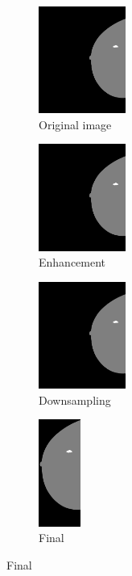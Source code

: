 \documentclass{beamer}
\begin{document}
\begin{frame}
\begin{figure}[h]
\begin{subfigure}{0.24\textwidth}
				\centering
					\includegraphics[height = 3.5cm]{plots/label.png}
				\caption{Original image}
				\label{subfig:Preprocessinga}
			\end{subfigure}
			\begin{subfigure}{0.24\textwidth}
				\centering
					\includegraphics[height = 3.5cm]{plots/label_enhanced.png}
				\caption{Enhancement}
				\label{subfig:Preprocessingb}
			\end{subfigure}
			\begin{subfigure}{0.24\textwidth}
				\centering
					\includegraphics[height = 3.5cm]{plots/label_resized.png}
				\caption{Downsampling}
				\label{subfig:Preprocessingc}
			\end{subfigure}
			\begin{subfigure}{0.11\textwidth}
				\centering
					\includegraphics[height = 3.5cm]{plots/label_v1.png}
				\caption{Final}
				\label{subfig:Preprocessingd}
			\end{subfigure}
		\end{figure}
	\end{frame}
	
\end{document}
